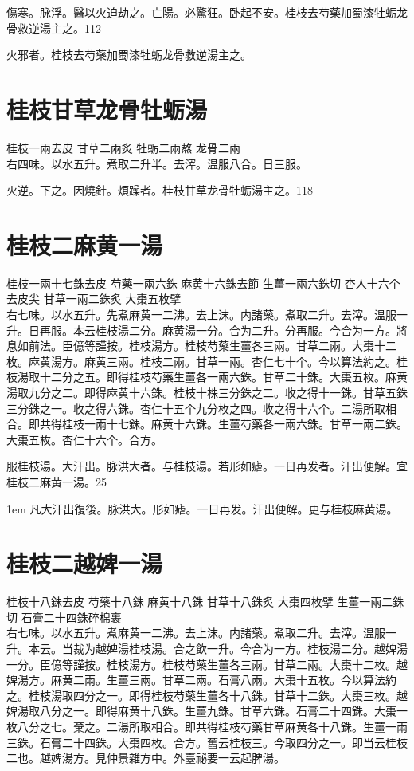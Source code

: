 傷寒。脉浮。醫以火迫劫之。亡陽。{\khaai 必}驚狂。卧起不安。桂枝去芍藥加蜀漆牡蛎龙骨救逆湯主之。112

火邪者。桂枝去芍藥加蜀漆牡蛎龙骨救逆湯主之。

\section{桂枝甘草龙骨牡蛎湯}

桂枝{\scriptsize 一兩去皮} 甘草{\scriptsize 二兩炙} 牡蛎{\scriptsize 二兩熬} 龙骨{\scriptsize 二兩}\\
右四味。以水五升。煮取二升半。去滓。温服八合。日三服。

火逆。下之。因燒針。煩躁者。桂枝甘草龙骨牡蛎湯主之。118

\section{桂枝二麻黄一湯}

桂枝{\scriptsize 一兩十七銖去皮} 芍藥{\scriptsize 一兩六銖} 麻黄{\scriptsize 十六銖去節} 生薑{\scriptsize 一兩六銖切} 杏人{\scriptsize 十六个去皮尖} 甘草{\scriptsize 一兩二銖炙} 大棗{\scriptsize 五枚擘}\\
右七味。以水五升。先煮麻黄一二沸。去上沫。内諸藥。煮取二升。去滓。温服一升。日再服。本云桂枝湯二分。麻黄湯一分。合为二升。分再服。今合为一方。將息如前法。{\scriptsize 臣億等謹按。桂枝湯方。桂枝芍藥生薑各三兩。甘草二兩。大棗十二枚。麻黄湯方。麻黄三兩。桂枝二兩。甘草一兩。杏仁七十个。今以算法約之。桂枝湯取十二分之五。即得桂枝芍藥生薑各一兩六銖。甘草二十銖。大棗五枚。麻黄湯取九分之二。即得麻黄十六銖。桂枝十株三分銖之二。收之得十一銖。甘草五銖三分銖之一。收之得六銖。杏仁十五个九分枚之四。收之得十六个。二湯所取相合。即共得桂枝一兩十七銖。麻黄十六銖。生薑芍藥各一兩六銖。甘草一兩二銖。大棗五枚。杏仁十六个。合方。}{\zhaoben}

服桂枝湯。大汗出。脉洪大者。与桂枝湯。若形如瘧。一日再发者。汗出便解。宜桂枝二麻黄一湯。25

\hangindent 1em
凡大汗出復後。脉洪大。形如瘧。一日再发。汗出便解。更与桂枝麻黄湯。{\yixin}

\section{桂枝二越婢一湯}

桂枝{\scriptsize 十八銖去皮} 芍藥{\scriptsize 十八銖} 麻黄{\scriptsize 十八銖} 甘草{\scriptsize 十八銖炙} 大棗{\scriptsize 四枚擘} 生薑{\scriptsize 一兩二銖切} 石膏{\scriptsize 二十四銖碎棉裹}\\
右七味。以水五升。煮麻黄一二沸。去上沫。内諸藥。煮取二升。去滓。温服一升。本云。当裁为越婢湯桂枝湯。合{\khaai 之}飲一升。今合为一方。桂枝湯二分。越婢湯一分。{\scriptsize 臣億等謹按。桂枝湯方。桂枝芍藥生薑各三兩。甘草二兩。大棗十二枚。越婢湯方。麻黄二兩。生薑三兩。甘草二兩。石膏八兩。大棗十五枚。今以算法約之。桂枝湯取四分之一。即得桂枝芍藥生薑各十八銖。甘草十二銖。大棗三枚。越婢湯取八分之一。即得麻黄十八銖。生薑九銖。甘草六銖。石膏二十四銖。大棗一枚八分之七。棄之。二湯所取相合。即共得桂枝芍藥甘草麻黄各十八銖。生薑一兩三銖。石膏二十四銖。大棗四枚。合方。舊云桂枝三。今取四分之一。即当云桂枝二也。越婢湯方。見仲景雜方中。外臺祕要一云起脾湯。}

